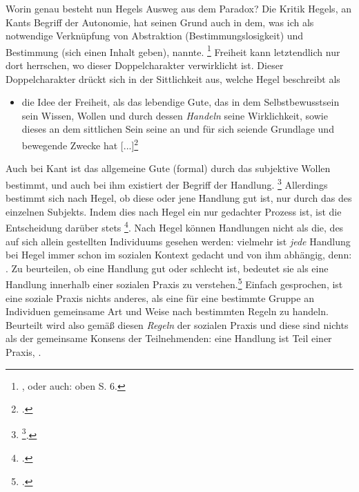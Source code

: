 \documentclass[12pt, a4paper, openany]{report}
\begin{document}
Worin genau besteht nun Hegels Ausweg aus dem Paradox?
Die Kritik Hegels, an Kants Begriff der Autonomie, hat seinen Grund auch in dem, was ich als notwendige Verknüpfung von Abstraktion (Bestimmungslosigkeit) und Bestimmung (sich einen Inhalt geben), nannte.%
\footnote{
    \cite[Vgl.][§ 7, S. 40.]{hegel_grundlinien_2017}, oder auch: oben S. 6.
}
Freiheit kann letztendlich nur dort herrschen, wo dieser Doppelcharakter verwirklicht ist.
Dieser Doppelcharakter drückt sich in der Sittlichkeit aus, welche Hegel beschreibt als 
\begin{itemize}
    \item[] die Idee der Freiheit, als das lebendige Gute, das in dem Selbstbewusstsein sein Wissen, Wollen und durch dessen \textit{Handeln} seine Wirklichkeit, sowie dieses an dem sittlichen Sein seine an und für sich seiende Grundlage und bewegende Zwecke hat [...]\footcite[][§ 142, S. 161. Hervorhebung von mir]{hegel_grundlinien_2017} 
\end{itemize}
Auch bei Kant ist das allgemeine Gute (formal) durch das subjektive Wollen bestimmt,
und auch bei ihm existiert der Begriff der Handlung.%
\footnote{
    \footcite[][S. 51. Hervorhebung von mir.]{kant_kritik_2014}.
}
Allerdings bestimmt sich nach Hegel, ob diese oder jene Handlung gut ist, nur durch das  des einzelnen Subjekts.
Indem dies nach Hegel ein nur gedachter Prozess ist, ist die Entscheidung darüber stets \footcite[][§ 132 A, S. 136]{hegel_grundlinien_2017}.
Nach Hegel können Handlungen nicht als die, des auf sich allein gestellten Individuums gesehen werden:
vielmehr ist \emph{jede} Handlung bei Hegel immer schon im sozialen Kontext gedacht und von ihm abhängig, denn:
.
Zu beurteilen, ob eine Handlung gut oder schlecht ist, bedeutet sie als eine Handlung innerhalb einer sozialen Praxis zu verstehen.\footcite[Vgl][28]{menke_autonomie_2018}
Einfach gesprochen, ist eine soziale Praxis nichts anderes, als eine für eine bestimmte Gruppe an Individuen gemeinsame Art und Weise nach bestimmten Regeln zu handeln.
Beurteilt wird also gemäß diesen \emph{Regeln} der sozialen Praxis und diese sind nichts als der gemeinsame Konsens der Teilnehmenden: 
eine Handlung ist Teil einer Praxis, .
\end{document}

